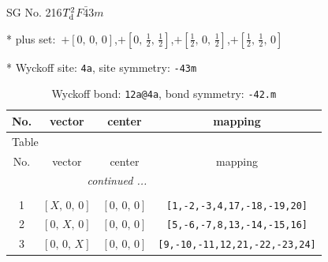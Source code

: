 \documentclass[fleqn,8pt]{jsarticle}
\begin{document}
\setcounter{MaxMatrixCols}{32}

\renewcommand{\tablename}{Table~}
\renewcommand{\figurename}{Figure~}
\begin{center}
\LARGE
SG No. 216\quad$T_{\rm d}^{2}$\quad$F\bar{4}3m$\quad[ cubic ]
\end{center}

* plus set:\,\,\,$+\left[ 0,\, 0,\, 0 \right]$,\quad $+\left[ 0,\, \frac{1}{2},\, \frac{1}{2} \right]$,\quad $+\left[ \frac{1}{2},\, 0,\, \frac{1}{2} \right]$,\quad $+\left[ \frac{1}{2},\, \frac{1}{2},\, 0 \right]$


* Wyckoff site: {\tt 4a}, site symmetry: {\tt -43m}
\renewcommand{\arraystretch}{1.2}
\begin{longtable}{cccc}
\caption{Wyckoff bond: {\tt 12a@4a}, bond symmetry: {\tt -42.m}}
 \\
 \hline \hline
No. & vector & center & mapping \\ \hline \endfirsthead

\multicolumn{3}{l}{\tablename\ \thetable{}} \\
 \hline \hline
No. & vector & center & mapping \\ \hline \endhead

 \hline \hline
\multicolumn{3}{r}{\footnotesize\it continued ...} \\ \endfoot

 \hline \hline
\multicolumn{3}{r}{} \\ \endlastfoot

1 & $\left[ X,\, 0,\, 0 \right]$ & $\left[ 0,\, 0,\, 0 \right]$ & {\tt [1,-2,-3,4,17,-18,-19,20]} \\ \hline
2 & $\left[ 0,\, X,\, 0 \right]$ & $\left[ 0,\, 0,\, 0 \right]$ & {\tt [5,-6,-7,8,13,-14,-15,16]} \\ \hline
3 & $\left[ 0,\, 0,\, X \right]$ & $\left[ 0,\, 0,\, 0 \right]$ & {\tt [9,-10,-11,12,21,-22,-23,24]} \\
\end{longtable}
\renewcommand{\arraystretch}{1.2}
\end{document}
